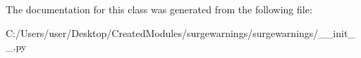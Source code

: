The documentation for this class was generated from the following file\+:\begin{DoxyCompactItemize}
\item 
C\+:/\+Users/user/\+Desktop/\+Created\+Modules/surgewarnings/surgewarnings/\+\_\+\+\_\+init\+\_\+\+\_\+.\+py\end{DoxyCompactItemize}
